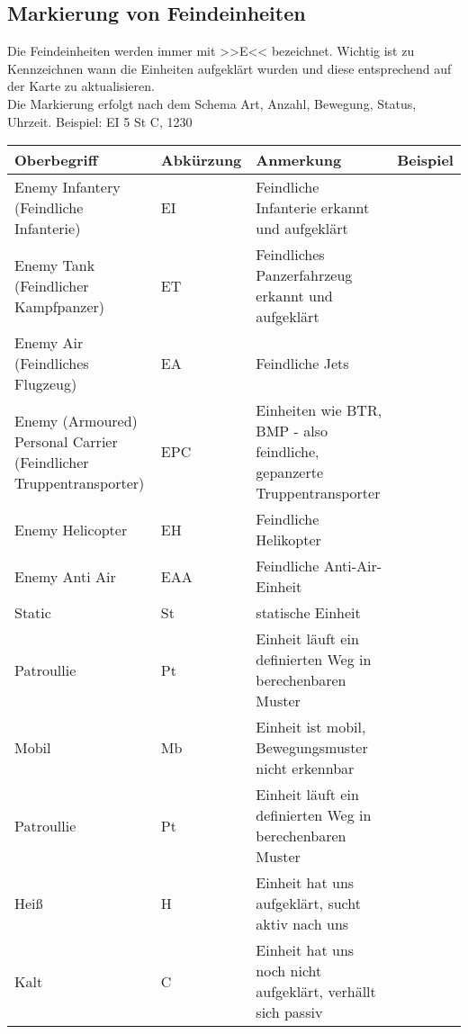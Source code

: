 \newpage

\subsection{Markierung von Feindeinheiten}
\label{EnemyUnits}

Die Feindeinheiten werden immer mit >>E<< bezeichnet. Wichtig ist zu Kennzeichnen wann die Einheiten aufgeklärt wurden und diese entsprechend auf der Karte zu aktualisieren. \\
Die Markierung erfolgt nach dem Schema Art, Anzahl, Bewegung, Status, Uhrzeit. Beispiel: EI 5 St  C, 1230

\begin{longtable}{|p{}|p{3 cm}|p{7cm}|p{3cm}|} 																										\hline
	Oberbegriff						&		Abkürzung			&				Anmerkung 									&		Beispiel 			\\ \hline
	Enemy Infantery (Feindliche Infanterie)		&		EI				&				Feindliche Infanterie erkannt und aufgeklärt				&						\\ \hline
	Enemy Tank (Feindlicher Kampfpanzer)		&		ET				&				Feindliches Panzerfahrzeug erkannt und aufgeklärt			&						\\ \hline	
	Enemy Air (Feindliches Flugzeug)			&		EA				&				Feindliche Jets								&						\\ \hline	
	Enemy (Armoured) Personal Carrier (Feindlicher Truppentransporter)	&		EPC	&			Einheiten wie BTR, BMP - also feindliche, gepanzerte Truppentransporter		&				\\ \hline	
	Enemy Helicopter					&		EH				&				Feindliche Helikopter							&						\\ \hline	
	Enemy Anti Air					&		EAA				&				Feindliche Anti-Air-Einheit							&						\\ \hline	
	Static							&		St				&				statische Einheit								&						\\ \hline	
	Patroullie						&		Pt				&				Einheit läuft ein definierten Weg in berechenbaren Muster		&						\\ \hline	
	Mobil							&		Mb				&				Einheit ist mobil, Bewegungsmuster nicht erkennbar			&						\\ \hline	
	Patroullie						&		Pt				&				Einheit läuft ein definierten Weg in berechenbaren Muster		&						\\ \hline
	Heiß							&		H				&				Einheit hat uns aufgeklärt, sucht aktiv nach uns			&						\\ \hline	
	Kalt							&		C				&				Einheit hat uns noch nicht aufgeklärt, verhällt sich passiv		&						\\ \hline		
\end{longtable}